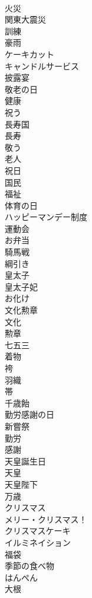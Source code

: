 \documentclass[8pt]{extreport}
\begin{document}
\begin{CJK}{UTF8}{min}
\\	火災
\\	関東大震災
\\	訓練
\\	豪雨
\\	ケーキカット
\\	キャンドルサービス
\\	披露宴
\\	敬老の日
\\	健康
\\	祝う
\\	長寿国
\\	長寿
\\	敬う
\\	老人
\\	祝日
\\	国民
\\	福祉
\\	体育の日
\\	ハッピーマンデー制度
\\	運動会
\\	お弁当
\\	騎馬戦
\\	綱引き
\\	皇太子
\\	皇太子妃
\\	お化け
\\	文化勲章
\\	文化
\\	勲章
\\	七五三
\\	着物
\\	袴
\\	羽織
\\	帯
\\	千歳飴
\\	勤労感謝の日
\\	新嘗祭
\\	勤労
\\	感謝
\\	天皇誕生日
\\	天皇
\\	天皇陛下
\\	万歳
\\	クリスマス
\\	メリー・クリスマス！
\\	クリスマスケーキ
\\	イルミネイション
\\	福袋
\\	季節の食べ物
\\	はんぺん
\\	大根

\end{CJK}
\end{document}

